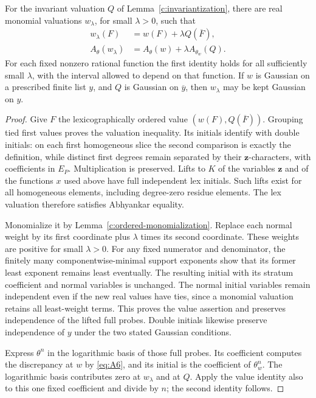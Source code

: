 \begin{lemma}\label{c:flattening}
For the invariant valuation \(Q\) of
Lemma~\ref{c:invariantization}, there are real monomial valuations
\(w_\lambda\), for small \(\lambda>0\), such that
\begin{equation}\label{eq:E2}
 \begin{split}
 w_\lambda(F)&=w(F)+\lambda Q(\overline F),\\
 A_\theta(w_\lambda)&=A_\theta(w)+\lambda A_{\theta_w}(Q).
 \end{split}
\end{equation}
For each fixed nonzero rational function the first identity holds
for all sufficiently small \(\lambda\), with the interval allowed
to depend on that function.  If \(w\) is Gaussian on a prescribed
finite list \(y\), and \(Q\) is Gaussian on \(\overline y\), then
\(w_\lambda\) may be kept Gaussian on \(y\).
\end{lemma}

\begin{proof}
Give \(F\) the lexicographically ordered value
\((w(F),Q(\overline F))\).  Grouping tied first values proves the
valuation inequality.  Its initials identify with double initials:
on each first homogeneous slice the second comparison is exactly
the definition, while distinct first degrees remain separated by
their \(\mathbf z\)-characters, with coefficients in \(E_P\).
Multiplication is preserved.  Lifts to \(K\) of the variables
\(\mathbf z\) and of the functions \(x\) used above have full
independent lex initials.  Such lifts exist for all homogeneous
elements, including degree-zero residue elements.  The lex valuation
therefore satisfies Abhyankar equality.

Monomialize it by Lemma~\ref{c:ordered-monomialization}.  Replace each
normal weight by its first coordinate plus \(\lambda\) times its
second coordinate.  These weights are positive for small
\(\lambda>0\).  For any fixed numerator and denominator, the finitely
many componentwise-minimal support exponents show that its former
least exponent remains least eventually.  The resulting initial
with its stratum coefficient and normal variables is unchanged.
The normal initial variables remain independent even if the new
real values have ties, since a monomial valuation retains all
least-weight terms.  This proves the value assertion and preserves
independence of the lifted full probes.  Double initials likewise
preserve independence of \(y\) under the two stated Gaussian
conditions.

Express \(\theta^n\) in the logarithmic basis of those full probes.
Its coefficient computes the discrepancy at \(w\) by
\eqref{eq:A6}, and its initial is the coefficient of \(\theta_w^n\).
The logarithmic basis contributes zero at \(w_\lambda\) and at \(Q\).
Apply the value identity also to this one fixed coefficient and
divide by \(n\); the second identity follows.
\end{proof}

